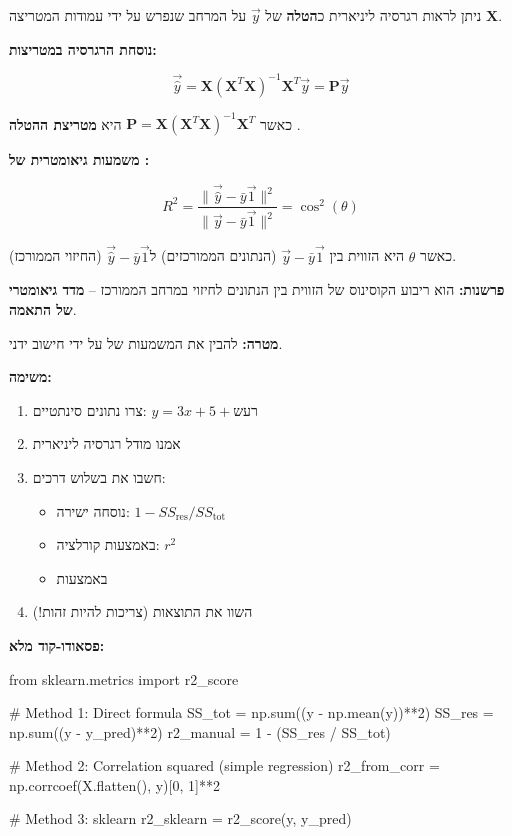 
ניתן לראות רגרסיה ליניארית כ\textbf{הטלה} של $\vec{y}$ על המרחב שנפרש על ידי עמודות המטריצה $\mathbf{X}$.

\textbf{נוסחת הרגרסיה במטריצות:}

\begin{equation}
\vec{\hat{y}} = \mathbf{X}(\mathbf{X}^T\mathbf{X})^{-1}\mathbf{X}^T\vec{y} = \mathbf{P}\vec{y}
\end{equation}

כאשר $\mathbf{P} = \mathbf{X}(\mathbf{X}^T\mathbf{X})^{-1}\mathbf{X}^T$ היא \textbf{מטריצת ההטלה} .

\textbf{משמעות גיאומטרית של \Rsquared{}:}

\[
R^2 = \frac{\|\vec{\hat{y}} - \bar{y}\vec{1}\|^2}{\|\vec{y} - \bar{y}\vec{1}\|^2} = \cos^2(\theta)
\]

כאשר $\theta$ היא הזווית בין $\vec{y} - \bar{y}\vec{1}$ (הנתונים הממורכזים) ל\en{-}$\vec{\hat{y}} - \bar{y}\vec{1}$ (החיזוי הממורכז).

\textbf{פרשנות:} \Rsquared{} הוא ריבוע הקוסינוס של הזווית בין הנתונים לחיזוי במרחב הממורכז – \textbf{מדד גיאומטרי של התאמה}.


\textbf{מטרה:} להבין את המשמעות של \Rsquared{} על ידי חישוב ידני.

\textbf{משימה:}

\begin{enumerate}
\item צרו נתונים סינתטיים: $y = \num{3}x + \num{5} + \text{רעש}$
\item אמנו מודל רגרסיה ליניארית
\item חשבו את \Rsquared{} בשלוש דרכים:
\begin{itemize}
\item נוסחה ישירה: $1 - SS_{\text{res}}/SS_{\text{tot}}$
\item באמצעות קורלציה: $r^2$
\item באמצעות 
\end{itemize}
\item השוו את התוצאות (צריכות להיות זהות!)
\end{enumerate}

\textbf{פסאודו-קוד מלא:}

\begin{pythonbox*}
from sklearn.metrics import r2_score

# Method 1: Direct formula
SS_tot = np.sum((y - np.mean(y))**2)
SS_res = np.sum((y - y_pred)**2)
r2_manual = 1 - (SS_res / SS_tot)

# Method 2: Correlation squared (simple regression)
r2_from_corr = np.corrcoef(X.flatten(), y)[0, 1]**2

# Method 3: sklearn
r2_sklearn = r2_score(y, y_pred)
\end{pythonbox*}

